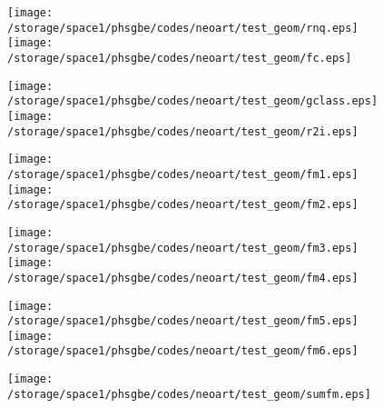 \documentclass[a4paper,12pt]{article}
\begin{document}
\begin{figure}[!htb]
        \begin{center}
        \texttt{[image: /storage/space1/phsgbe/codes/neoart/test\_geom/rnq.eps]}%
        \texttt{[image: /storage/space1/phsgbe/codes/neoart/test\_geom/fc.eps]}%
        \end{center}
\end{figure}
\begin{figure}[!htb]
        \begin{center}
        \texttt{[image: /storage/space1/phsgbe/codes/neoart/test\_geom/gclass.eps]}%
        \texttt{[image: /storage/space1/phsgbe/codes/neoart/test\_geom/r2i.eps]}%
        \end{center}
\end{figure}
\begin{figure}[!htb]
        \begin{center}
        \texttt{[image: /storage/space1/phsgbe/codes/neoart/test\_geom/fm1.eps]}%
        \texttt{[image: /storage/space1/phsgbe/codes/neoart/test\_geom/fm2.eps]}%
        \end{center}
\end{figure}
\begin{figure}[!htb]
        \begin{center}
        \texttt{[image: /storage/space1/phsgbe/codes/neoart/test\_geom/fm3.eps]}%
        \texttt{[image: /storage/space1/phsgbe/codes/neoart/test\_geom/fm4.eps]}%
        \end{center}
\end{figure}
\begin{figure}[!htb]
        \begin{center}
        \texttt{[image: /storage/space1/phsgbe/codes/neoart/test\_geom/fm5.eps]}%
        \texttt{[image: /storage/space1/phsgbe/codes/neoart/test\_geom/fm6.eps]}%
        \end{center}
\end{figure}
\begin{figure}[!htb]
        \begin{center}
        \texttt{[image: /storage/space1/phsgbe/codes/neoart/test\_geom/sumfm.eps]}%
        \end{center}
\end{figure}
\end{document}
